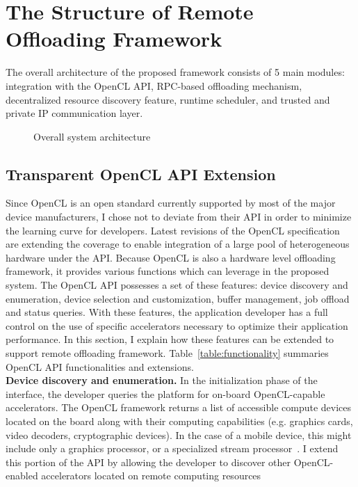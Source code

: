 \section{The Structure of Remote Offloading Framework}
\label{offloading:structure}
%
The overall architecture of the proposed framework consists of 5 main
modules: integration with the OpenCL API, RPC-based offloading
mechanism, decentralized resource discovery feature, runtime scheduler,
and trusted and private IP communication layer.
%
\begin{figure}
\centering
{}
\caption{Overall system architecture}
\label{fig:architecture}
\end{figure}
%
\subsection{Transparent OpenCL API Extension}
\label{offloading:API}
%
Since OpenCL is an open standard currently supported by most of the
major device manufacturers, I chose not to deviate from their API in
order to minimize the learning curve for developers.
%
Latest revisions of the OpenCL specification are extending the coverage
to enable integration of a large pool of heterogeneous hardware under
the API.
%
Because OpenCL is also a hardware level offloading framework, it
provides various functions which can leverage in the proposed system.
%
The OpenCL API possesses a set of these features: device discovery and
enumeration, device selection and customization, buffer management,
job offload and status queries.
%
With these features, the application developer has a full control on the
use of specific accelerators necessary to optimize their application
performance.
%
In this section, I explain how these features can be extended to support
remote offloading framework.
%
Table~\ref{table:functionality} summaries OpenCL API functionalities and extensions.\\
%
{\bf Device discovery and enumeration.} In the initialization phase of the
interface, the developer queries the platform for on-board
OpenCL-capable accelerators.
%
The OpenCL framework returns a list of accessible compute devices
located on the board along with their computing capabilities (e.g.
graphics cards, video decoders, cryptographic devices).
%
In the case of a mobile device, this might include only a graphics
processor, or a specialized stream processor~\cite{stemcell}.
%
I extend this portion of the API by allowing the developer to discover
other OpenCL-enabled accelerators located on remote computing resources

